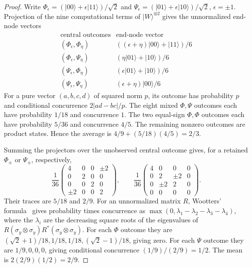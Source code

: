 \documentclass[11pt,a4paper]{article}
\begin{document}
\begin{proof}
Write $\Phi_\epsilon=(|00\rangle+\epsilon|11\rangle)/\sqrt2$ and
$\Psi_\epsilon=(|01\rangle+\epsilon|10\rangle)/\sqrt2$,
$\epsilon=\pm1$. Projection of the nine computational terms of
$|W\rangle^{\otimes2}$ gives the unnormalized end-node vectors
\[
 \begin{array}{c|c}
 \text{central outcomes}&\text{end-node vector}\\\hline
 (\Phi_\epsilon,\Phi_\eta)&((\epsilon+\eta)|00\rangle+|11\rangle)/6\\
 (\Phi_\epsilon,\Psi_\eta)&(\eta|01\rangle+|10\rangle)/6\\
 (\Psi_\epsilon,\Phi_\eta)&(\epsilon|01\rangle+|10\rangle)/6\\
 (\Psi_\epsilon,\Psi_\eta)&(\epsilon+\eta)|00\rangle/6
 \end{array}
\]
For a pure vector $(a,b,c,d)$ of squared norm $p$, its outcome has
probability $p$ and conditional concurrence $2|ad-bc|/p$.
The eight mixed $\Phi,\Psi$ outcomes each have probability $1/18$
and concurrence $1$. The two equal-sign $\Phi,\Phi$ outcomes each
have probability $5/36$ and concurrence $4/5$. The remaining
nonzero outcomes are product states. Hence the average is
$4/9+(5/18)(4/5)=2/3$.

Summing the projectors over the unobserved central outcome gives,
for a retained $\Phi_\pm$ or $\Psi_\pm$, respectively,
\[
 \frac1{36}\begin{pmatrix}4&0&0&\pm2\\0&2&0&0\\0&0&2&0\\\pm2&0&0&2\end{pmatrix},
 \qquad
 \frac1{36}\begin{pmatrix}4&0&0&0\\0&2&\pm2&0\\0&\pm2&2&0\\0&0&0&0\end{pmatrix}.
\]
Their traces are $5/18$ and $2/9$. For an unnormalized matrix $R$,
Wootters' formula~\cite[Eq.~(10)]{Wootters} gives probability times
concurrence as $\max(0,\lambda_1-\lambda_2-\lambda_3-\lambda_4)$,
where the $\lambda_i$ are the decreasing square roots of the eigenvalues
of $R(\sigma_y\otimes\sigma_y)R^*(\sigma_y\otimes\sigma_y)$.
For each $\Phi$ outcome they are
$(\sqrt2+1)/18,1/18,1/18,(\sqrt2-1)/18$, giving zero.
For each $\Psi$ outcome they are $1/9,0,0,0$, giving conditional
concurrence $(1/9)/(2/9)=1/2$. The mean is $2(2/9)(1/2)=2/9$.
\end{proof}
\end{document}
